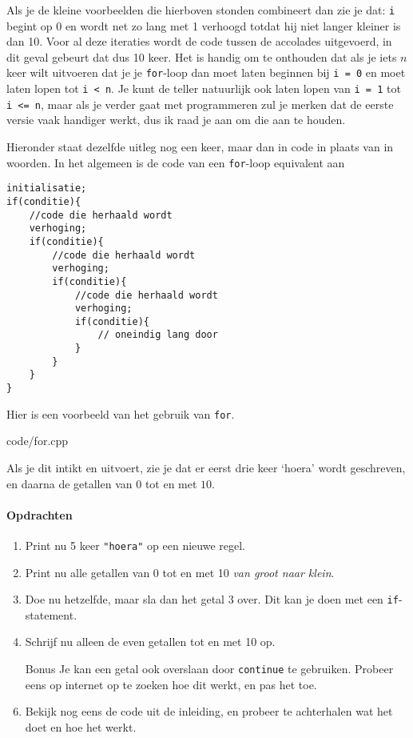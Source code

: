 \documentclass[12pt,a4paper]{article}
\newcommand{\code}{}
\newcommand{\icode}{\lstinline}
\begin{document}
Als je de kleine voorbeelden die hierboven stonden combineert dan zie je dat: \icode{i} begint op 0 en wordt net zo lang met 1 verhoogd totdat hij niet langer kleiner is dan 10. Voor al deze iteraties wordt de code tussen de accolades uitgevoerd, in dit geval gebeurt dat dus 10 keer. Het is handig om te onthouden dat als je iets $n$ keer wilt uitvoeren dat je je \icode{for}-loop dan moet laten beginnen bij \icode{i = 0} en moet laten lopen tot \icode{i < n}. Je kunt de teller natuurlijk ook laten lopen van \icode{i = 1} tot \icode{i <= n}, maar als je verder gaat met programmeren zul je merken dat de eerste versie vaak handiger werkt, dus ik raad je aan om die aan te houden.

Hieronder staat dezelfde uitleg nog een keer, maar dan in code in plaats van in woorden. In het algemeen is de code van een \icode{for}-loop equivalent aan
\begin{lstlisting}
initialisatie;
if(conditie){
	//code die herhaald wordt
	verhoging;
	if(conditie){
		//code die herhaald wordt
		verhoging;
		if(conditie){
			//code die herhaald wordt
			verhoging;
			if(conditie){
				// oneindig lang door
			}
		}
	}
}
\end{lstlisting}
Hier is een voorbeeld van het gebruik van \icode{for}.

\code{code/for.cpp}

Als je dit intikt en uitvoert, zie je dat er eerst drie keer `hoera' wordt geschreven, en daarna de getallen van $0$ tot en met $10$.

\paragraph{Opdrachten}
\begin{enumerate}
	\item
		Print nu 5 keer \icode{"hoera"} op een nieuwe regel.
    \item 
        Print nu alle getallen van 0 tot en met 10 \textit{van groot naar klein}.
	\item
		Doe nu hetzelfde, maar sla dan het getal 3 over. Dit kan je doen met een \icode{if}-statement.
	\item
		Schrijf nu alleen de even getallen tot en met 10 op.
	\item[Bonus] 
		Je kan een getal ook overslaan door \icode{continue} te gebruiken.
		Probeer eens op internet op te zoeken hoe dit werkt, en pas het toe.
	\item
		Bekijk nog eens de code uit de inleiding, en probeer te achterhalen wat het doet en hoe het werkt.
\end{enumerate}
\end{document}

